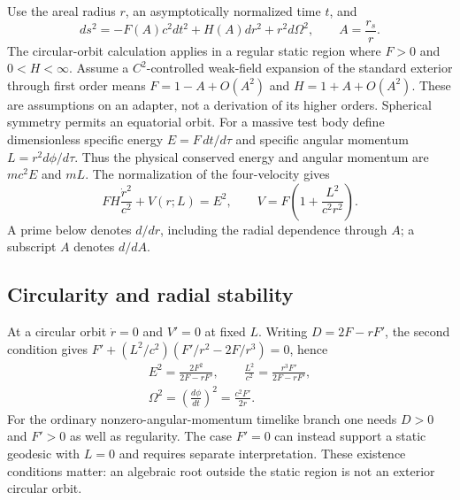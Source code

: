 \documentclass[10pt,twocolumn,letterpaper]{article}
\begin{document}
Use the areal radius $r$, an asymptotically normalized time $t$, and
\begin{equation}
 ds^2=-F(A)c^2dt^2+H(A)dr^2+r^2d\Omega^2,
 \qquad A=\frac{r_s}{r}.
 \label{eq:orbit-general-metric}
\end{equation}
The circular-orbit calculation applies in a regular static region where
$F>0$ and $0<H<\infty$. Assume a $C^2$-controlled weak-field expansion of the standard exterior
through first order means $F=1-A+O(A^2)$ and $H=1+A+O(A^2)$.
These are assumptions on an adapter, not a derivation of its higher
orders. Spherical symmetry permits an equatorial orbit. For a massive
test body define dimensionless specific energy
$E=F\,dt/d\tau$ and specific angular momentum
$L=r^2d\phi/d\tau$. Thus the physical conserved energy and angular
momentum are $mc^2E$ and $mL$. The normalization of the four-velocity
gives
\begin{equation}
 FH\frac{\dot r^2}{c^2}+V(r;L)=E^2,
 \qquad V=F\left(1+\frac{L^2}{c^2r^2}\right).
 \label{eq:orbit-radial-potential}
\end{equation}
A prime below denotes $d/dr$, including the radial dependence through
$A$; a subscript $A$ denotes $d/dA$.

\subsection{Circularity and radial stability}
At a circular orbit $\dot r=0$ and $V'=0$ at fixed $L$.
Writing $D=2F-rF'$, the second condition gives
$F'+(L^2/c^2)(F'/r^2-2F/r^3)=0$, hence
\begin{equation}
 \begin{gathered}
 E^2=\frac{2F^2}{2F-rF'},\qquad
 \frac{L^2}{c^2}=\frac{r^3F'}{2F-rF'},\\
 \Omega^2=\left(\frac{d\phi}{dt}\right)^2=\frac{c^2F'}{2r}.
 \end{gathered}
 \label{eq:orbit-circular-invariants}
\end{equation}
For the ordinary nonzero-angular-momentum timelike branch one needs
$D>0$ and $F'>0$ as well as regularity. The case $F'=0$ can instead
support a static geodesic with $L=0$ and requires separate interpretation.
These existence conditions matter: an algebraic root outside the static
region is not an exterior circular orbit.
\end{document}
